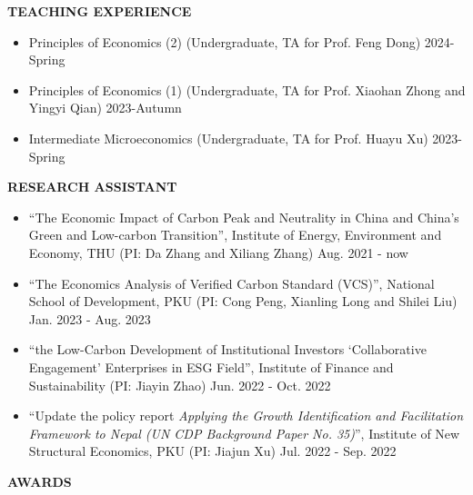 \documentclass[UTF8]{ctexbook}
\begin{document}
\vspace{12pt}


\begin{center}
    \textbf{TEACHING EXPERIENCE}
\end{center}


\begin{itemize}
    \item Principles of Economics (2) (Undergraduate, TA for Prof. Feng Dong) \hfill 2024-Spring
    \item Principles of Economics (1) (Undergraduate, TA for Prof. Xiaohan Zhong and Yingyi Qian) \hfill 2023-Autumn
    \item Intermediate Microeconomics (Undergraduate, TA for Prof. Huayu Xu) \hfill 2023-Spring
\end{itemize}

\vspace{12pt}

\begin{center}
    \textbf{RESEARCH ASSISTANT}
\end{center}


\begin{itemize}
    \item ``The Economic Impact of Carbon Peak and Neutrality in China and China's Green and Low-carbon Transition'', Institute of Energy, Environment and Economy, THU (PI: Da Zhang and Xiliang Zhang) \hfill Aug. 2021 - now
    \item ``The Economics Analysis of Verified Carbon Standard (VCS)'', National School of Development, PKU (PI: Cong Peng, Xianling Long and Shilei Liu) \hfill Jan. 2023 - Aug. 2023
    \item ``the Low-Carbon Development of Institutional Investors `Collaborative Engagement' Enterprises in ESG Field'', Institute of Finance and Sustainability (PI: Jiayin Zhao) \hfill Jun. 2022 - Oct. 2022
    \item ``Update the policy report \textit{Applying the Growth Identification and Facilitation Framework to Nepal (UN CDP Background Paper No. 35)}'', Institute of New Structural Economics, PKU (PI: Jiajun Xu) \hfill Jul. 2022 - Sep. 2022

\end{itemize}

\vspace{12pt}

\begin{center}
    \textbf{AWARDS}
\end{center}
\end{document}
